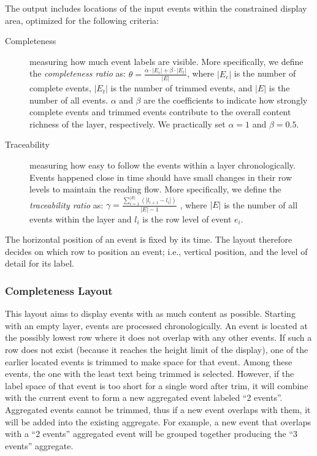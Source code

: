 The output includes locations of the input events within the constrained display area, optimized for the following criteria:
\begin{description}
	\item[Completeness] measuring how much event labels are visible. More specifically, we define the \emph{completeness ratio} as:
	$\theta = \frac{\alpha \cdot |E_c| + \beta \cdot |E_t|}{|E|}$, where $|E_c|$ is the number of complete events, $|E_t|$ is the number of trimmed events, and $|E|$ is the number of all events. $\alpha$ and $\beta$ are the coefficients to indicate how strongly complete events and trimmed events contribute to the overall content richness of the layer, respectively. We practically set $\alpha=1$ and $\beta=0.5$.

	\item[Traceability] measuring how easy to follow the events within a layer chronologically. Events happened close in time should have small changes in their row levels to maintain the reading flow. More specifically, we define the \emph{traceability ratio} as:
	$\gamma=\frac{\sum\limits_{i=1}^{|E|}(|l_{i+1} - l_i|)}{|E|-1}$	, where $|E|$ is the number of all events within the layer and $l_i$ is the row level of event $e_i$.
\end{description}

The horizontal position of an event is fixed by its time. The layout therefore decides on which row to position an event; i.e., vertical position, and the level of detail for its label.

\subsubsection{Completeness Layout}
This layout aims to display events with as much content as possible. Starting with an empty layer, events are processed chronologically. An event is located at the possibly lowest row where it does not overlap with any other events. If such a row does not exist (because it reaches the height limit of the display), one of the earlier located events is trimmed to make space for that event. Among these events, the one with the least text being trimmed is selected. However, if the label space of that event is too short for a single word after trim, it will combine with the current event to form a new aggregated event labeled ``2 events''. Aggregated events cannot be trimmed, thus if a new event overlaps with them, it will be added into the existing aggregate. For example, a new event that overlaps with a ``2 events'' aggregated event will be grouped together producing the ``3 events'' aggregate.

